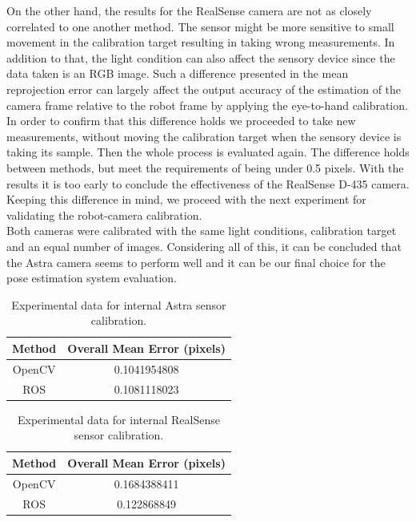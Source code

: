 On the other hand, the results for the RealSense camera are not as closely correlated to one another method. The sensor might be more sensitive to small movement in the calibration target resulting in taking wrong measurements. In addition to that, the light condition can also affect the sensory device since the data taken is an RGB image. Such a difference presented in the mean reprojection error can largely affect the output accuracy of the estimation of the camera frame relative to the robot frame by applying the eye-to-hand calibration. In order to confirm that this difference holds we proceeded to take new measurements, without moving the calibration target when the sensory device is taking its sample. Then the whole process is evaluated again. The difference holds between methods, but meet the requirements of being under 0.5 pixels. With the results it is too early to conclude the effectiveness of the RealSense D-435 camera. Keeping this difference in mind, we proceed with the next experiment for validating the robot-camera calibration.  \\
Both cameras were calibrated with the same light conditions, calibration target and an equal number of images. Considering all of this, it can be concluded that the Astra camera seems to perform well and it can be our final choice for the pose estimation system evaluation. 

\begin{table}[ht]
\renewcommand{\arraystretch}{1.3}
\caption{Experimental data for internal Astra sensor calibration.}
\label{astra1}
\centering
\begin{tabular}{|c|c|}
\hline
Method & Overall Mean Error (pixels)\\
\hline
OpenCV &  0.1041954808\\
\hline
ROS &  0.1081118023\\
\hline
\end{tabular}
\end{table}

\begin{table}[ht]
\renewcommand{\arraystretch}{1.3}
\caption{Experimental data for internal RealSense sensor calibration.}
\label{real1}
\centering
\begin{tabular}{|c|c|}
\hline
Method & Overall Mean Error (pixels)\\
\hline
OpenCV &  0.1684388411\\
\hline
ROS &  0.122868849\\
\hline
\end{tabular}
\end{table}

